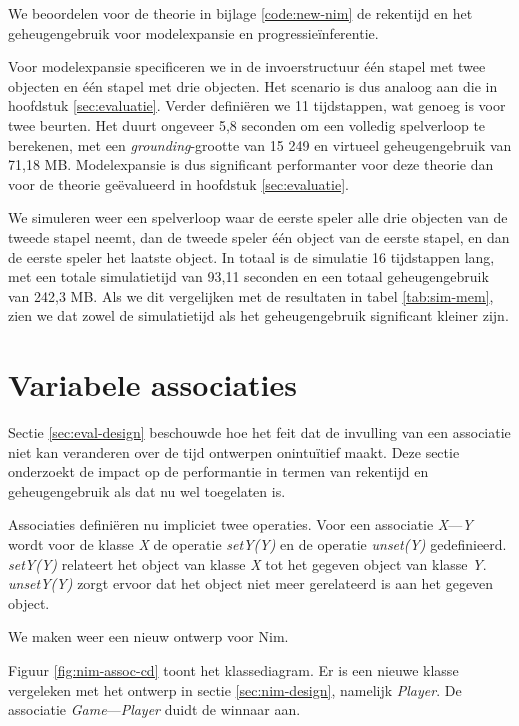 We beoordelen voor de theorie in bijlage \ref{code:new-nim} de rekentijd en het geheugengebruik voor modelexpansie en progressie\"inferentie.

Voor modelexpansie specificeren we in de invoerstructuur \'e\'en stapel met twee objecten en \'e\'en stapel met drie objecten. Het scenario is dus analoog aan die in hoofdstuk \ref{sec:evaluatie}. Verder defini\"eren we 11 tijdstappen, wat genoeg is voor twee beurten. Het duurt ongeveer 5,8 seconden om een volledig spelverloop te berekenen, met een \textit{grounding}-grootte van 15 249 en virtueel geheugengebruik van 71,18 MB. Modelexpansie is dus significant performanter voor deze theorie dan voor de theorie ge\"evalueerd in hoofdstuk \ref{sec:evaluatie}.

We simuleren weer een spelverloop waar de eerste speler alle drie objecten van de tweede stapel neemt, dan de tweede speler \'e\'en object van de eerste stapel, en dan de eerste speler het laatste object. In totaal is de simulatie 16 tijdstappen lang, met een totale simulatietijd van 93,11 seconden en een totaal geheugengebruik van 242,3 MB. Als we dit vergelijken met de resultaten in tabel \ref{tab:sim-mem}, zien we dat zowel de simulatietijd als het geheugengebruik significant kleiner zijn.

\section{Variabele associaties}

Sectie \ref{sec:eval-design} beschouwde hoe het feit dat de invulling van een associatie niet kan veranderen over de tijd ontwerpen onintu\"itief maakt. Deze sectie onderzoekt de impact op de performantie in termen van rekentijd en geheugengebruik als dat nu wel toegelaten is.

Associaties defini\"eren nu impliciet twee operaties. Voor een associatie \textit{X}---\textit{Y} wordt voor de klasse \textit{X} de operatie \textit{setY(Y)} en de operatie \textit{unset(Y)} gedefinieerd. \textit{setY(Y)} relateert het object van klasse \textit{X} tot het gegeven object van klasse \textit{Y}. \textit{unsetY(Y)} zorgt ervoor dat het object niet meer gerelateerd is aan het gegeven object.

We maken weer een nieuw ontwerp voor Nim.

Figuur \ref{fig:nim-assoc-cd} toont het klassediagram. Er is een nieuwe klasse vergeleken met het ontwerp in sectie \ref{sec:nim-design}, namelijk \textit{Player}. De associatie \textit{Game}---\textit{Player} duidt de winnaar aan.

